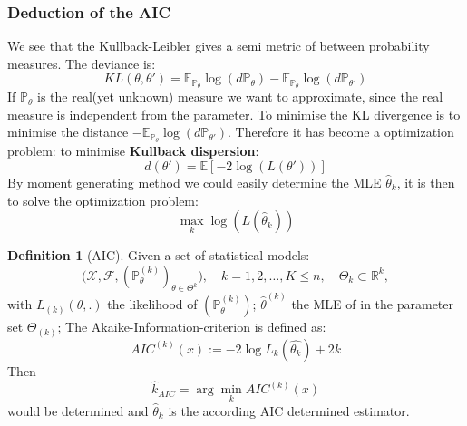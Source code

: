 \documentclass[a4paper,12pt, oneside, fleqn]{book}
\theoremstyle{definition}
\newtheorem{definition}{Definition}[section]
\theoremstyle{remark}
\begin{document}
\subsubsection{Deduction of the AIC}
We see that the Kullback-Leibler gives a semi metric of between probability measures. The deviance is:
\begin{equation*}
	KL(\theta, \theta') = \mathbb{E}_{\mathbb{P}_\theta} \log(d\mathbb{P}_\theta) - \mathbb{E}_{\mathbb{P}_\theta} \log(d\mathbb{P}_{\theta'})
\end{equation*}
If $\mathbb{P}_\theta$ is the real(yet unknown) measure we want to approximate, since the real measure is independent from the parameter. To minimise the KL divergence is to minimise the distance $-\mathbb{E}_{\mathbb{P}_\theta} \log(d\mathbb{P}_{\theta'})$. Therefore it has become a optimization problem: to minimise \textbf{Kullback dispersion}: 
\begin{equation*}
    d(\theta') = \mathbb{E}[-2\log (L(\theta'))]
\end{equation*}
By moment generating method we could easily determine the MLE $\hat{\theta}_k$, it is then to solve the optimization problem:
\begin{equation*}
		\max_k \log(L(\hat{\theta}_k))
\end{equation*}




\begin{definition}[AIC]
Given a set of statistical models:
\begin{equation*}
    \bigg(\mathcal{X}, \mathcal{F}, (\mathbb{P}_\theta^{(k)})_{\theta \in \Theta^k}\bigg), \quad k = 1, 2, \dots, K \leq n,\quad \Theta_k \subset \mathbb{R}^k,
\end{equation*}
with
$L_{(k)}(\theta, .)$ the likelihood of $(\mathbb{P}_\theta^{(k)})$; 
$\hat{\theta}^{(k)}$ the MLE of in the parameter set $\Theta_{(k)}$; 
The Akaike-Information-criterion is defined as:
\begin{equation}
    AIC^{(k)}(x) := -2\log L_k(\hat{\theta_k}) + 2k
\end{equation}
Then 
\begin{equation}
    \hat{k}_{AIC} = \arg \min_k AIC^{(k)}(x)
\end{equation} would be determined and $\hat{\theta}_k$ is the according AIC determined estimator. 
\end{definition}
\end{document}
